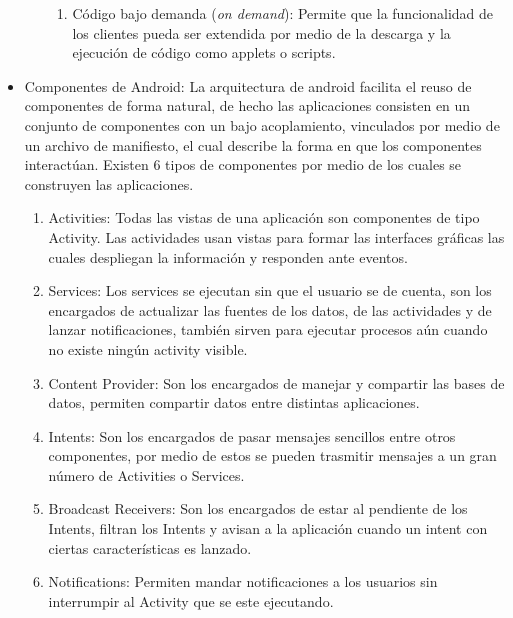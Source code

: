 \documentclass[12pt,a4paper,spanish,openany]{book}
\begin{document}
\begin{itemize}
\begin{enumerate}
\begin{enumerate}
    \item Código bajo demanda (\emph{on demand}): Permite que la funcionalidad
    de los clientes pueda ser extendida por medio de la descarga y la ejecución
    de código como applets o scripts.

    
  \end{enumerate}
  

  
\end{enumerate}


\item Componentes de Android: La arquitectura de android facilita el reuso de
componentes de forma natural, de hecho las aplicaciones consisten en un
conjunto de componentes con un bajo acoplamiento, vinculados por medio de un
archivo de manifiesto, el cual describe  la forma en que los componentes
interactúan. Existen 6 tipos de componentes por medio de los cuales se
construyen las aplicaciones.
\begin{enumerate}
  \item Activities: Todas las vistas de una aplicación son componentes de tipo
  Activity. Las actividades usan vistas para formar las interfaces gráficas
  las cuales despliegan la información y responden ante eventos.
  \item Services: Los services se ejecutan sin que el usuario se de cuenta,
  son los encargados de actualizar las fuentes de los datos, de las
  actividades y de lanzar notificaciones, también sirven para ejecutar
  procesos aún cuando no existe ningún activity visible.
  \item Content Provider: Son los encargados de manejar y compartir las bases
  de datos, permiten compartir datos entre distintas aplicaciones.
  \item Intents: Son los encargados de pasar mensajes sencillos entre otros
  componentes, por medio de estos se pueden trasmitir mensajes a un gran
  número de Activities o Services.
  \item Broadcast Receivers: Son los encargados de estar al pendiente de los
  Intents, filtran los Intents y avisan a la aplicación cuando un intent con
  ciertas características es lanzado.
  
  \item Notifications: Permiten mandar notificaciones a los usuarios sin
  interrumpir al Activity que se este ejecutando.
  
\end{enumerate}

\end{itemize}
\end{document}
